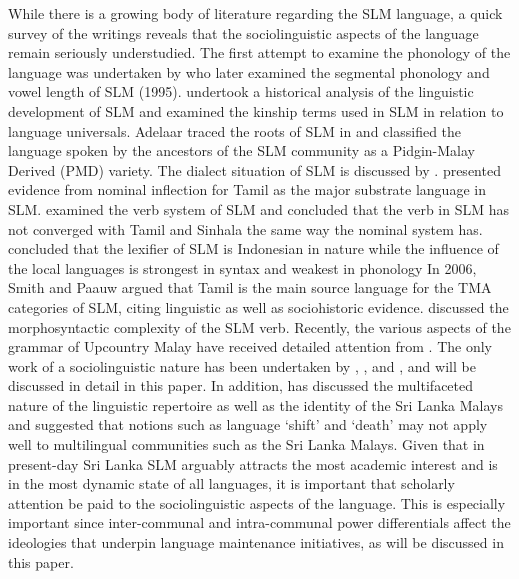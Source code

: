 While there is a growing body of literature regarding the SLM language, a quick survey of the writings reveals that the sociolinguistic aspects of the language remain seriously understudied. The first attempt to examine the phonology of the language was undertaken by \citet{Tapovanaye1986} who later examined the segmental phonology and vowel length of SLM (1995).\nocite{Tapovanaye1995} \citet{Bichsel1989} undertook a historical analysis of the linguistic development of SLM and \citet{Kekulawala1979} examined the kinship terms used in SLM in relation to language universals. Adelaar traced the roots of SLM in \citet{Adelaar1991} and \citet{AdelaarEtAl1996} classified the language spoken by the ancestors of the SLM community as a Pidgin-Malay Derived (PMD) variety. The dialect situation of SLM is discussed by \citet{Robuchon2003}. \citet{Smith2003timing} presented evidence from nominal inflection for Tamil as the major substrate language in SLM. \citet{Slomanson2003} examined the verb system of SLM and concluded that the verb in SLM has not converged with Tamil and Sinhala the same way the nominal system has. 
\citet{SmithEtAl2004} concluded that the lexifier of SLM is Indonesian in nature while the influence of the local languages is strongest in syntax and weakest in phonology
In 2006, Smith and Paauw  \nocite{SmithEtAl2006cll} argued that Tamil is the main source language for the TMA categories of SLM, citing linguistic as well as sociohistoric evidence. \citet{Slomanson2008lingua} discussed the morphosyntactic complexity of the SLM verb. Recently, the various aspects of the grammar of Upcountry Malay have received detailed attention from \citet{Nordhoff2009}. The only work of a sociolinguistic nature has been undertaken by \citet{AnsaldoEtAl2006}, \citet{LimEtAl2006,LimEtAl2007}, and \citet{Ansaldo2008genesis}, and will be discussed in detail in this paper. In addition, \citet{Ansaldo2009book} has discussed the multifaceted nature of the linguistic repertoire as well as the identity of the Sri Lanka Malays and suggested that notions such as language `shift' and `death' may not apply well to multilingual communities such as the Sri Lanka Malays. %
Given that in present-day Sri Lanka SLM arguably attracts the most academic interest and is in the most dynamic state of all languages, it is important that scholarly attention be paid to the sociolinguistic aspects of the language. This is especially important since inter-communal and intra-communal power differentials affect the ideologies that underpin language maintenance initiatives, as will be discussed in this paper. 

